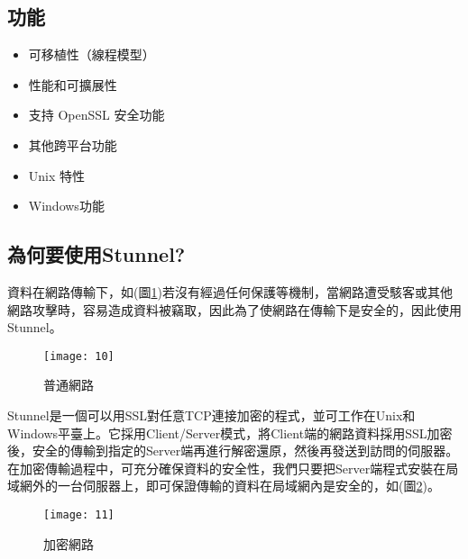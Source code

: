 \subsection{功能}
\renewcommand{\baselinestretch}{1} %
\begin{itemize}
	\item 可移植性（線程模型）
	\item 性能和可擴展性
	\item 支持 OpenSSL 安全功能
	\item 其他跨平台功能
	\item Unix 特性
	\item Windows功能	
\end{itemize}
\par

\renewcommand{\baselinestretch}{20} %
\subsection{為何要使用Stunnel?}
\par
\renewcommand{\baselinestretch}{1} %
\twelve \qquad 資料在網路傳輸下，如(圖\ref{fig.普通網路})若沒有經過任何保護等機制，當網路遭受駭客或其他網路攻擊時，容易造成資料被竊取，因此為了使網路在傳輸下是安全的，因此使用Stunnel。
\\
\par
\renewcommand{\baselinestretch}{1.7} %
\begin{figure}[hbt!]
\begin{center}
\texttt{[image: 10]}
\caption{\large 普通網路}\label{fig.普通網路}
\end{center}
\end{figure}
\par

\newpage

\renewcommand{\baselinestretch}{1} %
\twelve \hspace{0.5em} Stunnel是一個可以用SSL對任意TCP連接加密的程式，並可工作在Unix和Windows平臺上。它採用Client/Server模式，將Client端的網路資料採用SSL加密後，安全的傳輸到指定的Server端再進行解密還原，然後再發送到訪問的伺服器。在加密傳輸過程中，可充分確保資料的安全性，我們只要把Server端程式安裝在局域網外的一台伺服器上，即可保證傳輸的資料在局域網內是安全的，如(圖\ref{fig.加密網路})。
\\
\par
\renewcommand{\baselinestretch}{1.7} %
\begin{figure}[hbt!]
\begin{center}
\texttt{[image: 11]}
\caption{\large 加密網路}\label{fig.加密網路}
\end{center}
\end{figure}
\par

